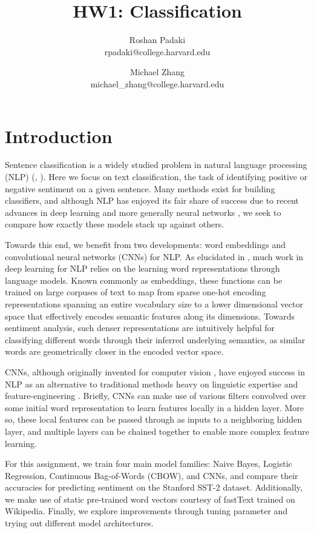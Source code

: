 \documentclass[11pt]{article}
\title{HW1: Classification}
\author{Roshan Padaki \\ rpadaki@college.harvard.edu \and Michael Zhang \\ michael\_zhang@college.harvard.edu }
\begin{document}
\maketitle{}
\section{Introduction}

Sentence classification is a widely studied problem in natural language processing (NLP) (\cite{wang2012baselines}, \cite{berger1996maximum}). Here we focus on text classification, the task of identifying positive or negative sentiment on a given sentence. Many methods exist for building classifiers, and although NLP has enjoyed its fair share of success due to recent advances in deep learning and more generally neural networks \citep{collobert2011natural}, we seek to compare how exactly these models stack up against others.

Towards this end, we benefit from two developments: word embeddings and convolutional neural networks (CNNs) for NLP. As elucidated in \citet{DBLP:journals/corr/Kim14f}, much work in deep learning for NLP relies on the learning word representations through language models. Known commonly as embeddings, these functions can be trained on large corpuses of text to map from sparse one-hot encoding representations spanning an entire vocabulary size to a lower dimensional vector space that effectively encodes semantic features along its dimensions. Towards sentiment analysis, such denser representations are intuitively helpful for classifying different words through their inferred underlying semantics, as similar words are geometrically closer in the encoded vector space.

CNNs, although originally invented for computer vision \citep{Lecun98gradient-basedlearning}, have enjoyed success in NLP as an alternative to traditional methods heavy on linguistic expertise and feature-engineering \citep{collobert2011natural}. Briefly, CNNs can make use of various filters convolved over some initial word representation to learn features locally in a hidden layer. More so, these local features can be passed through as inputs to a neighboring hidden layer, and multiple layers can be chained together to enable more complex feature learning.

For this assignment, we train four main model families: Naive Bayes, Logistic Regression, Continuous Bag-of-Words (CBOW), and CNNs, and compare their accuracies for predicting sentiment on the Stanford SST-2 dataset. Additionally, we make use of static pre-trained word vectors courtesy of fastText trained on Wikipedia. Finally, we explore improvements through tuning parameter and trying out different model architectures. 
\end{document}
